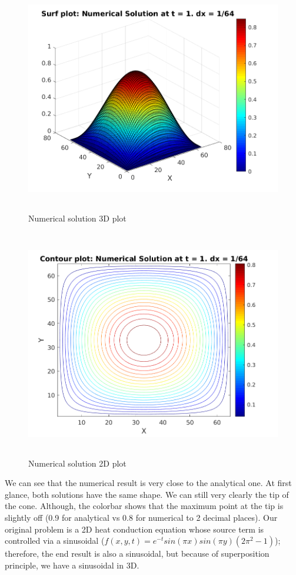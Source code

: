\documentclass[12pt]{article}
\begin{document}
	\begin{figure}[H]
		\hfill\includegraphics[width=150mm,height= 100mm]{numsurf.png}\hspace*{\fill}
		\caption{Numerical solution 3D plot}
	\end{figure}
	
	\begin{figure}[H]
		\hfill\includegraphics[width=150mm,height= 100mm]{numcontour.png}\hspace*{\fill}
		\caption{Numerical solution 2D plot}
	\end{figure}
	\noindent
	We can see that the numerical result is very close to the analytical one. At first glance, both solutions have the same shape. We can still very clearly the tip of the cone. Although, the colorbar shows that the maximum point at the tip is slightly off (0.9 for analytical vs 0.8 for numerical to 2 decimal places). Our original problem is a 2D heat conduction equation whose source term is controlled via a sinusoidal ($	f(x,y,t) = e^{-t}sin(\pi x)sin(\pi y)(2\pi ^2 -1)$); therefore, the end result is also a sinusoidal, but because of superposition principle, we have a sinusoidal in 3D.
\end{document}
